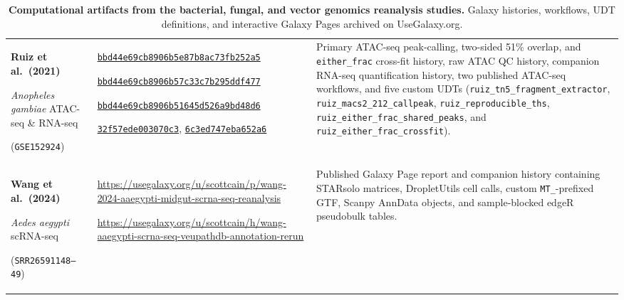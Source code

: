 \documentclass[11pt,letterpaper]{article}
\newcommand{\tool}[1]{\textsf{#1}}
\begin{document}
\begin{table}[!htbp]
\begin{tabularx}{\textwidth}{p{3.0cm}p{4.8cm}X}
\addlinespace
\textbf{Ruiz et al.\ (2021)} \par \textit{Anopheles gambiae} ATAC-seq \& RNA-seq \par (\texttt{GSE152924}) &
\href{https://usegalaxy.org/histories/view?id=bbd44e69cb8906b5e87b8ac73fb252a5}{\texttt{bbd44e69cb8906b5e87b8ac73fb252a5}} \par
\href{https://usegalaxy.org/histories/view?id=bbd44e69cb8906b57c33c7b295ddf477}{\texttt{bbd44e69cb8906b57c33c7b295ddf477}} \par
\href{https://usegalaxy.org/histories/view?id=bbd44e69cb8906b51645d526a9bd48d6}{\texttt{bbd44e69cb8906b51645d526a9bd48d6}} \par
\href{https://usegalaxy.org/published/workflow?id=32f57ede003070c3}{\texttt{32f57ede003070c3}}, \href{https://usegalaxy.org/published/workflow?id=6c3ed747eba652a6}{\texttt{6c3ed747eba652a6}} &
Primary ATAC-seq peak-calling, two-sided 51\% overlap, and \texttt{either\_frac} cross-fit history, raw ATAC QC history, companion RNA-seq quantification history, two published ATAC-seq workflows, and five custom UDTs (\nolinkurl{ruiz_tn5_fragment_extractor}, \nolinkurl{ruiz_macs2_212_callpeak}, \nolinkurl{ruiz_reproducible_ths}, \nolinkurl{ruiz_either_frac_shared_peaks}, and \nolinkurl{ruiz_either_frac_crossfit}). \\
\addlinespace
\textbf{Wang et al.\ (2024)} \par \textit{Aedes aegypti} scRNA-seq \par (\texttt{SRR26591148--49}) &
\url{https://usegalaxy.org/u/scottcain/p/wang-2024-aaegypti-midgut-scrna-seq-reanalysis} \par
\url{https://usegalaxy.org/u/scottcain/h/wang-aaegypti-scrna-seq-veupathdb-annotation-rerun} &
Published Galaxy Page report and companion history containing \tool{STARsolo} matrices, \tool{DropletUtils} cell calls, custom \texttt{MT\_}-prefixed GTF, \tool{Scanpy} AnnData objects, and sample-blocked \tool{edgeR} pseudobulk tables. \\
\bottomrule
\end{tabularx}
\caption{\textbf{Computational artifacts from the bacterial, fungal, and vector genomics reanalysis studies.} Galaxy histories, workflows, UDT definitions, and interactive Galaxy Pages archived on UseGalaxy.org.}
\label{tab:brc_artifacts}
\end{table}

\clearpage
\end{document}
